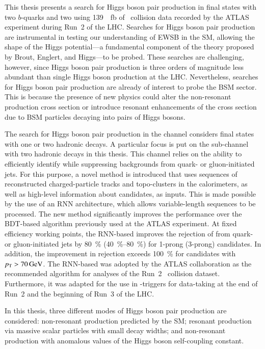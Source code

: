 This thesis presents a search for Higgs boson pair production in final states
with two $b$-quarks and two \tauleptons using \SI{139}{\per\femto\barn} of
\pp~collision data recorded by the ATLAS experiment during Run~2 of the
LHC. Searches for Higgs boson pair production are instrumental in testing our
understanding of EWSB in the SM, allowing the shape of the Higgs potential---a
fundamental component of the theory proposed by Brout, Englert, and Higgs---to
be probed. These searches are challenging, however, since Higgs boson pair
production is three orders of magnitude less abundant than single Higgs boson
production at the LHC. Nevertheless, searches for Higgs boson pair production
are already of interest to probe the BSM sector. This is because the presence of
new physics could alter the non-resonant \HH production cross section or
introduce resonant enhancements of the cross section due to BSM particles
decaying into pairs of Higgs bosons.


The search for Higgs boson pair production in the \bbtautau channel considers
final states with one or two hadronic \taulepton decays. A particular focus is
put on the sub-channel with two hadronic \taulepton decays in this thesis. This
channel relies on the ability to efficiently identify \tauhadvis while
suppressing backgrounds from quark- or gluon-initiated jets. For this purpose, a
novel \tauid method is introduced that uses sequences of reconstructed
charged-particle tracks and topo-clusters in the calorimeters, as well as
high-level information about \tauhadvis candidates, as inputs. This is made
possible by the use of an RNN architecture, which allows variable-length
sequences to be processed. The new method significantly improves the \tauid
performance over the BDT-based algorithm previously used at the ATLAS
experiment. At fixed \tauhadvis efficiency working points, the RNN-based \tauid
improves the rejection of \faketauhadvis from quark- or gluon-initiated jets by
\SI{80}{\percent} (\SIrange{40}{80}{\percent}) for 1-prong (3-prong) \tauhadvis
candidates. In addition, the improvement in \faketauhadvis rejection exceeds
\SI{100}{\percent} for candidates with $\pT > \SI{70}{\GeV}$. The RNN-based
\tauid was adopted by the ATLAS collaboration as the recommended \tauid
algorithm for analyses of the Run~2 \pp~collision dataset. Furthermore, it was
adapted for the use in \tauhadvis-triggers for data-taking at the end of Run~2
and the beginning of Run~3 of the LHC.


In this thesis, three different modes of Higgs boson pair production are
considered: non-resonant \HH production predicted by the SM; resonant \HH
production via massive scalar particles with small decay widths; and
non-resonant \HH production with anomalous values of the Higgs boson
self-coupling constant.


